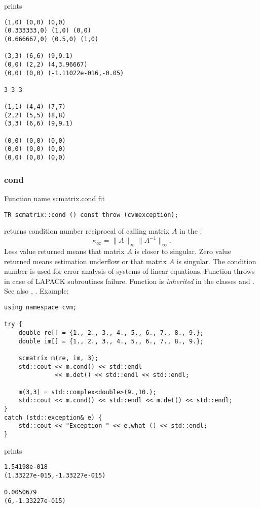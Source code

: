 prints
\begin{Verbatim}
(1,0) (0,0) (0,0)
(0.333333,0) (1,0) (0,0)
(0.666667,0) (0.5,0) (1,0)

(3,3) (6,6) (9,9.1)
(0,0) (2,2) (4,3.96667)
(0,0) (0,0) (-1.11022e-016,-0.05)

3 3 3

(1,1) (4,4) (7,7)
(2,2) (5,5) (8,8)
(3,3) (6,6) (9,9.1)

(0,0) (0,0) (0,0)
(0,0) (0,0) (0,0)
(0,0) (0,0) (0,0)
\end{Verbatim}
\newpage




\subsubsection{cond}
Function%
\pdfdest name {scmatrix.cond} fit
\begin{verbatim}
TR scmatrix::cond () const throw (cvmexception);
\end{verbatim}
returns  condition number reciprocal of 
calling matrix $A$ in the :
\begin{equation*}
\kappa_\infty=\|A\|_\infty \|A^{-1}\|_\infty.
\end{equation*}
Less value returned means that matrix $A$ is closer to singular.
Zero value returned means estimation underflow or
that matrix $A$ is singular.
The condition number is used for error analysis
of systems of linear equations.
Function throws  in case of LAPACK
subroutines failure.
Function is \emph{inherited} in the classes
and .
See also
, .
Example:
\begin{Verbatim}
using namespace cvm;

try {
    double re[] = {1., 2., 3., 4., 5., 6., 7., 8., 9.};
    double im[] = {1., 2., 3., 4., 5., 6., 7., 8., 9.};

    scmatrix m(re, im, 3);
    std::cout << m.cond() << std::endl 
              << m.det() << std::endl << std::endl;

    m(3,3) = std::complex<double>(9.,10.);
    std::cout << m.cond() << std::endl << m.det() << std::endl;
}
catch (std::exception& e) {
    std::cout << "Exception " << e.what () << std::endl;
}
\end{Verbatim}
prints
\begin{Verbatim}
1.54198e-018
(1.33227e-015,-1.33227e-015)

0.0050679
(6,-1.33227e-015)
\end{Verbatim}
\newpage




